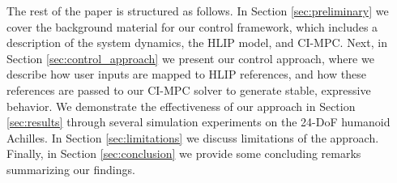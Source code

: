 The rest of the paper is structured as follows. In Section \ref{sec:preliminary} we cover the background material  for our control framework, which includes a description of the system dynamics, the HLIP model, and CI-MPC. Next, in Section \ref{sec:control_approach} we present our control approach, where we describe how user inputs are mapped to HLIP references, and how these references are passed to our CI-MPC solver to generate stable, expressive behavior. We demonstrate the effectiveness of our approach in Section \ref{sec:results} through several simulation experiments on the 24-DoF humanoid Achilles. In Section \ref{sec:limitations} we discuss limitations of the approach. Finally, in Section \ref{sec:conclusion} we provide some concluding remarks summarizing our findings.

